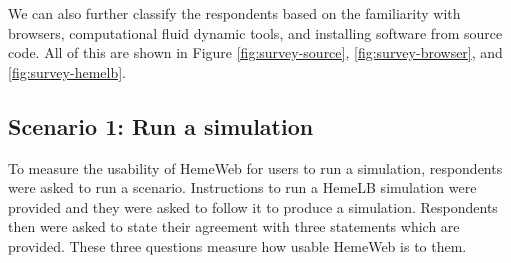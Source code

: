 \noindent%
\begin{minipage}{\linewidth}%
 \label{fig:survey-hemelb}%
\end{minipage}

\vspace{1cm}


We can also further classify the respondents based on the familiarity with browsers, computational fluid dynamic tools, and installing software from source code. All of this are shown in Figure \ref{fig:survey-source}, \ref{fig:survey-browser}, and \ref{fig:survey-hemelb}.




\subsection{Scenario 1: Run a simulation}

To measure the usability of HemeWeb for users to run a simulation, respondents were asked to run a  scenario. Instructions to run a HemeLB simulation were provided and they were asked to follow it to produce a simulation. Respondents then were asked to state their agreement with three statements which are provided. These three questions measure how usable HemeWeb is to them. 


\vspace{1cm}


